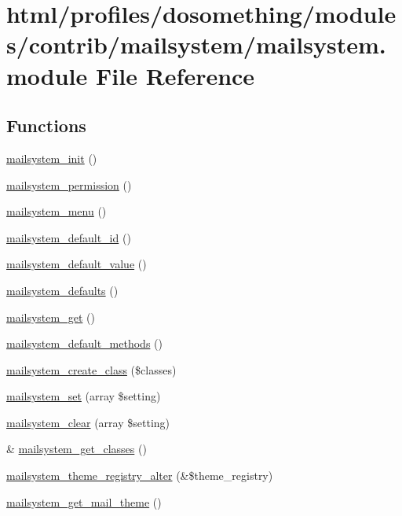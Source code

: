 \hypertarget{mailsystem_8module}{
\section{html/profiles/dosomething/modules/contrib/mailsystem/mailsystem.module File Reference}
\label{mailsystem_8module}
}
\subsection*{Functions}
\begin{DoxyCompactItemize}
\item 
\hyperlink{mailsystem_8module_afbcc929c2d7814467338374507f0688f}{mailsystem\_\-init} ()
\item 
\hyperlink{mailsystem_8module_a661f773ba0f39c8574a74280c979660f}{mailsystem\_\-permission} ()
\item 
\hyperlink{mailsystem_8module_a5540af016c9247e7f9505ebcb1a8883b}{mailsystem\_\-menu} ()
\item 
\hyperlink{mailsystem_8module_a6dc2bc890196d513049110b752b33cb5}{mailsystem\_\-default\_\-id} ()
\item 
\hyperlink{mailsystem_8module_ac6dcd069efd821e73a67945b2f18e525}{mailsystem\_\-default\_\-value} ()
\item 
\hyperlink{mailsystem_8module_a167ec538a63c35ea94941d5413ad18eb}{mailsystem\_\-defaults} ()
\item 
\hyperlink{mailsystem_8module_af474b2a7b012502b3899c3e6c6780e92}{mailsystem\_\-get} ()
\item 
\hyperlink{mailsystem_8module_a550d9fb0b029f862fbfdfc31670ca4da}{mailsystem\_\-default\_\-methods} ()
\item 
\hyperlink{mailsystem_8module_ab195299394dfae7d0d164998d261ed36}{mailsystem\_\-create\_\-class} (\$classes)
\item 
\hyperlink{mailsystem_8module_a2b62d67e268ecc0f8302ac7043d71927}{mailsystem\_\-set} (array \$setting)
\item 
\hyperlink{mailsystem_8module_ad8ad240cc7b72d29e1dad8cba00f85b0}{mailsystem\_\-clear} (array \$setting)
\item 
\& \hyperlink{mailsystem_8module_aa0df7ed89cbad0a84bc5da2b5d8f551a}{mailsystem\_\-get\_\-classes} ()
\item 
\hyperlink{mailsystem_8module_a07a179ae1d27c3fe2e0722316e6088e4}{mailsystem\_\-theme\_\-registry\_\-alter} (\&\$theme\_\-registry)
\item 
\hyperlink{mailsystem_8module_af55c024d345c05de91cddc64ca83b7f7}{mailsystem\_\-get\_\-mail\_\-theme} ()
\end{DoxyCompactItemize}



